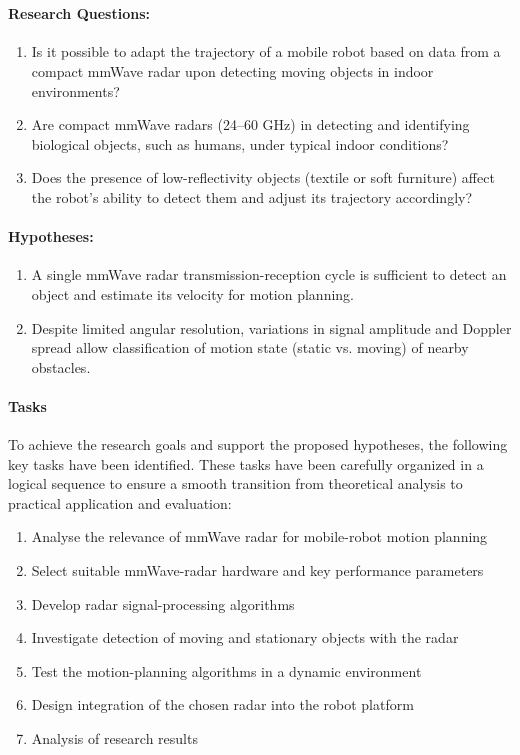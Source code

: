 \\
\paragraph{Research Questions:}

\begin{enumerate}
    \item Is it possible to adapt the trajectory of a mobile robot based on data from a compact mmWave radar upon detecting moving objects in indoor environments?
    \item Are compact mmWave radars (24–60 GHz) in detecting and identifying biological objects, such as humans, under typical indoor conditions?
    \item Does the presence of low-reflectivity objects (textile or soft furniture) affect the robot's ability to detect them and adjust its trajectory accordingly?
\end{enumerate}

\paragraph{Hypotheses:}

\begin{enumerate}
    \item A single mmWave radar transmission-reception cycle is sufficient to detect an object and estimate its velocity for motion planning.
    \item  Despite limited angular resolution, variations in signal amplitude and Doppler spread allow classification of motion state (static vs. moving) of nearby obstacles.
\end{enumerate}




\paragraph{Tasks}
To achieve the research goals and support the proposed hypotheses, the following key tasks have been identified. These tasks have been carefully organized in a logical sequence to ensure a smooth transition from theoretical analysis to practical application and evaluation:

\begin{enumerate}
  \item Analyse the relevance of mmWave radar for mobile-robot motion planning 
  \item Select suitable mmWave-radar hardware and key performance parameters
  \item Develop radar signal-processing algorithms
  \item Investigate detection of moving and stationary objects with the radar
  \item Test the motion-planning algorithms in a dynamic environment
   \item Design integration of the chosen radar into the robot platform

  \item Analysis of research results
\end{enumerate}


